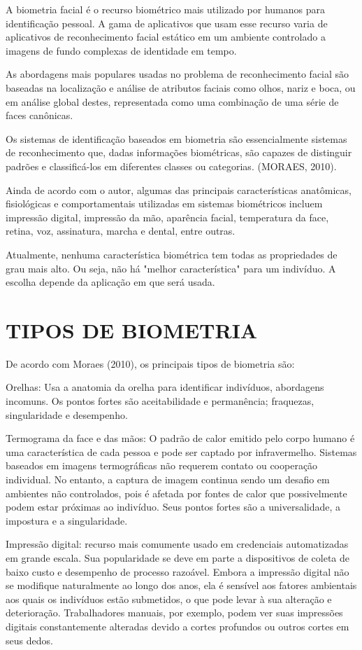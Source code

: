 A biometria facial é o recurso biométrico mais utilizado por humanos para identificação 
pessoal. A gama de aplicativos que usam esse recurso varia de aplicativos de reconhecimento 
facial estático em um ambiente controlado a imagens de fundo complexas de identidade em 
tempo.

As abordagens mais populares usadas no problema de reconhecimento facial são 
baseadas na localização e análise de atributos faciais como olhos, nariz e boca, ou em análise 
global destes, representada como uma combinação de uma série de faces canônicas.

Os sistemas de identificação baseados em biometria são essencialmente sistemas de 
reconhecimento que, dadas informações biométricas, são capazes de distinguir padrões e 
classificá-los em diferentes classes ou categorias.  (MORAES, 2010).

Ainda de acordo com o autor, algumas das principais características anatômicas, 
fisiológicas e comportamentais utilizadas em sistemas biométricos incluem impressão digital, 
impressão da mão, aparência facial, temperatura da face, retina, voz, assinatura, marcha e dental, 
entre outras.

Atualmente, nenhuma característica biométrica tem todas as propriedades de grau mais 
alto. Ou seja, não há "melhor característica" para um indivíduo. A escolha depende da aplicação 
em que será usada.

\section{TIPOS DE BIOMETRIA}\label{sec:formatacaoTexto}

De acordo com Moraes (2010), os principais tipos de biometria são:

Orelhas: Usa a anatomia da orelha para identificar indivíduos, abordagens incomuns. 
Os pontos fortes são aceitabilidade e permanência; fraquezas, singularidade e desempenho.

Termograma da face e das mãos: O padrão de calor emitido pelo corpo humano é uma 
característica de cada pessoa e pode ser captado por infravermelho. Sistemas baseados 
em imagens termográficas não requerem contato ou cooperação individual. No entanto, a 
captura de imagem continua sendo um desafio em ambientes não controlados, pois é afetada 
por fontes de calor que possivelmente podem estar próximas ao indivíduo. Seus pontos fortes 
são a universalidade, a impostura e a singularidade.

Impressão digital: recurso mais comumente usado em credenciais automatizadas em grande escala. 
Sua popularidade se deve em parte a dispositivos de coleta de baixo custo e desempenho de 
processo razoável. Embora a impressão digital não se modifique naturalmente ao longo dos anos, 
ela é sensível aos fatores ambientais aos quais os indivíduos estão submetidos, o que pode 
levar à sua alteração e deterioração. Trabalhadores manuais, por exemplo, podem ver suas 
impressões digitais constantemente alteradas devido a cortes profundos ou outros cortes em 
seus dedos.

